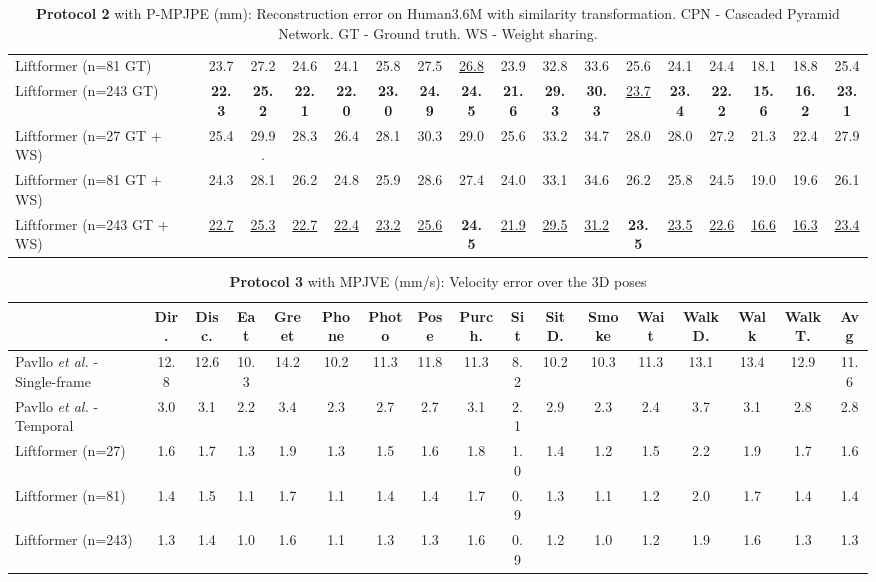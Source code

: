\documentclass[letterpaper]{article}
\begin{document}
\begin{table*}[tp]
\begin{adjustbox}{width=1\textwidth}
\begin{tabular}{l|ccccccccccccccc|c}
Liftformer (n=81 GT)  & 23.7 & 27.2 & 24.6 & 24.1 & 25.8 & 27.5 & \underline{26.8} & 23.9 & 32.8 & 33.6 & 25.6 & 24.1 & 24.4 & 18.1 & 18.8 & 25.4\\
Liftformer (n=243 GT)  & \textbf{22.3} & \textbf{25.2} & \textbf{22.1} & \textbf{22.0} & \textbf{23.0} & \textbf{24.9} & \textbf{24.5} & \textbf{21.6} & \textbf{29.3} & \textbf{30.3} & \underline{23.7} & \textbf{23.4} & \textbf{22.2} & \textbf{15.6} & \textbf{16.2} & \textbf{23.1} \\
\hline
Liftformer (n=27 GT + WS) & 25.4 & 29.9. & 28.3 & 26.4 & 28.1 & 30.3 & 29.0 & 25.6 & 33.2 & 34.7 & 28.0 & 28.0 & 27.2 & 21.3 & 22.4 & 27.9 \\
Liftformer (n=81 GT + WS) & 24.3 & 28.1 & 26.2 & 24.8 & 25.9 & 28.6 & 27.4 & 24.0 & 33.1 & 34.6 & 26.2 & 25.8 & 24.5 & 19.0 & 19.6 & 26.1 \\
Liftformer (n=243 GT + WS) & \underline{22.7} & \underline{25.3} & \underline{22.7} & \underline{22.4} & \underline{23.2} & \underline{25.6} & \textbf{24.5} & \underline{21.9} & \underline{29.5} & \underline{31.2} & \textbf{23.5} & \underline{23.5} & \underline{22.6} & \underline{16.6} & \underline{16.3} & \underline{23.4} \\
\end{tabular}
\end{adjustbox}
\caption{\textbf{Protocol 2} with P-MPJPE (mm): Reconstruction error on Human3.6M with similarity transformation. CPN - Cascaded Pyramid Network. GT - Ground truth. WS - Weight sharing.}
\label{h36m:p-mpjpe}
\end{table*}

\begin{table*}[tp]
\begin{adjustbox}{width=1\textwidth}
\begin{tabular}{l|ccccccccccccccc|c}
& Dir. & Disc. & Eat & Greet & Phone & Photo & Pose & Purch. & Sit & SitD. & Smoke & Wait & WalkD. & Walk & WalkT. & Avg \\
\hline
Pavllo \textit{et al.} \cite{pavllo19} - Single-frame & 12.8 & 12.6 & 10.3 & 14.2 & 10.2 & 11.3 & 11.8 & 11.3 & 8.2 & 10.2 & 10.3 & 11.3 & 13.1 & 13.4 & 12.9 & 11.6 \\
Pavllo \textit{et al.} \cite{pavllo19} - Temporal & 3.0 & 3.1 & 2.2 & 3.4 & 2.3 & 2.7 & 2.7 & 3.1 & 2.1 & 2.9 & 2.3 & 2.4 & 3.7 & 3.1 & 2.8 & 2.8 \\
\hline
Liftformer (n=27) & 1.6 & 1.7 & 1.3 & 1.9 & 1.3 & 1.5 & 1.6 & 1.8 & 1.0 & 1.4 & 1.2 & 1.5 & 2.2 & 1.9 & 1.7 & 1.6\\
Liftformer (n=81) & 1.4 & 1.5 & 1.1 & 1.7 & 1.1 & 1.4 & 1.4 & 1.7 & 0.9 & 1.3 & 1.1 & 1.2 & 2.0 & 1.7 & 1.4 & 1.4 \\
Liftformer (n=243) & 1.3 & 1.4 & 1.0 & 1.6 & 1.1 & 1.3 & 1.3 & 1.6 & 0.9 & 1.2 & 1.0 & 1.2 & 1.9 & 1.6 & 1.3 & 1.3 \\
\end{tabular}
\end{adjustbox}
\caption{\textbf{Protocol 3} with MPJVE (mm/s): Velocity error over the 3D poses}
\label{h36m:mpjve}
\end{table*}
\end{document}
